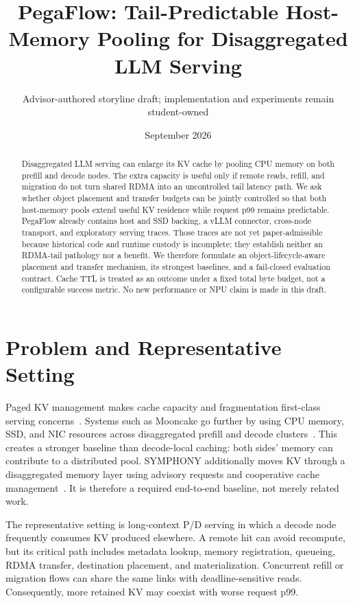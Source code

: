 \documentclass[10pt]{article}
\title{PegaFlow: Tail-Predictable Host-Memory Pooling for Disaggregated LLM Serving}
\author{Advisor-authored storyline draft; implementation and experiments remain student-owned}
\date{September 2026}
\begin{document}
\maketitle

\begin{abstract}
Disaggregated LLM serving can enlarge its KV cache by pooling CPU memory on
both prefill and decode nodes. The extra capacity is useful only if remote
reads, refill, and migration do not turn shared RDMA into an uncontrolled tail
latency path. We ask whether object placement and transfer budgets can be
jointly controlled so that both host-memory pools extend useful KV residence
while request p99 remains predictable. PegaFlow already contains host and SSD
backing, a vLLM connector, cross-node transport, and exploratory serving
traces. Those traces are not yet paper-admissible because historical code and
runtime custody is incomplete; they establish neither an RDMA-tail pathology
nor a benefit. We therefore formulate an object-lifecycle-aware placement and
transfer mechanism, its strongest baselines, and a fail-closed evaluation
contract. Cache TTL is treated as an outcome under a fixed total byte budget,
not a configurable success metric. No new performance or NPU claim is made in
this draft.
\end{abstract}

\section{Problem and Representative Setting}

Paged KV management makes cache capacity and fragmentation first-class serving
concerns~\cite{kwon2023pagedattention}. Systems such as Mooncake go further by
using CPU memory, SSD, and NIC resources across disaggregated prefill and decode
clusters~\cite{qin2025mooncake}. This creates a stronger baseline than
decode-local caching: both sides' memory can contribute to a distributed pool.
SYMPHONY additionally moves KV through a disaggregated memory layer using
advisory requests and cooperative cache management~\cite{agarwal2026symphony}.
It is therefore a required end-to-end baseline, not merely related work.

The representative setting is long-context P/D serving in which a decode node
frequently consumes KV produced elsewhere. A remote hit can avoid recompute,
but its critical path includes metadata lookup, memory registration, queueing,
RDMA transfer, destination placement, and materialization. Concurrent refill
or migration flows can share the same links with deadline-sensitive reads.
Consequently, more retained KV may coexist with worse request p99.
\end{document}
